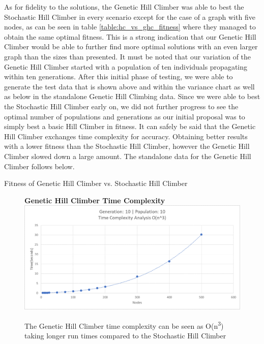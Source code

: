 \documentclass[sigplan,screen]{acmart}
\begin{document}
As for fidelity to the solutions, the Genetic Hill Climber was able to best the
Stochastic Hill Climber in every scenario except for the case of a graph with
five nodes, as can be seen in table \ref{table:hc_vs_ghc_fitness} where they
managed to obtain the same optimal fitness. This is a strong indication that our
Genetic Hill Climber would be able to further find more optimal solutions with
an even larger graph than the sizes than presented. It must be noted that our
variation of the Genetic Hill Climber started with a population of ten
individuals propagating within ten generations. After this initial phase of
testing, we were able to generate the test data that is shown above and within
the variance chart as well as below in the standalone Genetic Hill Climbing
data. Since we were able to best the Stochastic Hill Climber early on, we did
not further progress to see the optimal number of populations and generations as
our initial proposal was to simply best a basic Hill Climber in fitness. It can
safely be said that the Genetic Hill Climber exchanges time complexity for
accuracy. Obtaining better results with a lower fitness than the Stochastic Hill
Climber, however the Genetic Hill Climber slowed down a large amount. The
standalone data for the Genetic Hill Climber follows below.

\begin{table}[h]
    \centering
    
    \caption{Fitness of Genetic Hill Climber vs. Stochastic Hill Climber}
    \label{table:hc_vs_ghc_fitness}
\end{table}

\begin{figure}[h]
    \centering
    \textbf{Genetic Hill Climber Time Complexity}
    \includegraphics[width=\columnwidth]{assets/ghc_graph.png}
    \caption{The Genetic Hill Climber time complexity can be seen as
        O(n\textsuperscript{3}) taking longer run times compared to the
        Stochastic Hill Climber}
    \label{fig:ghc_timecomplexity}
\end{figure}
\end{document}
